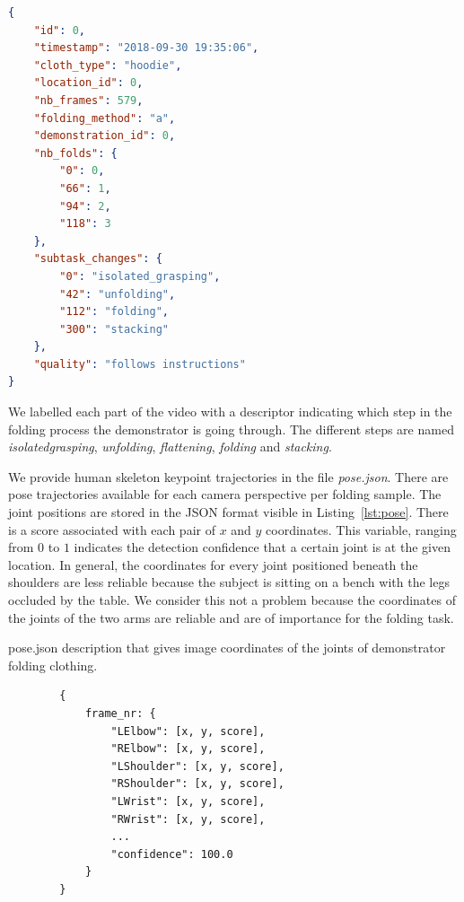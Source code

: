 \documentclass[\home/main.tex]{subfiles}
\begin{document}
\begin{lstlisting}[language=json, caption=annotations.json description, label={lst:annotations}, float,floatplacement=H, captionpos=b]
{
    "id": 0,
    "timestamp": "2018-09-30 19:35:06",
    "cloth_type": "hoodie",
    "location_id": 0,
    "nb_frames": 579,
    "folding_method": "a",
    "demonstration_id": 0,
    "nb_folds": {
        "0": 0,
        "66": 1,
        "94": 2,
        "118": 3
    },
    "subtask_changes": {
        "0": "isolated_grasping",
        "42": "unfolding",
        "112": "folding",
        "300": "stacking"
    },
    "quality": "follows instructions"
}
\end{lstlisting}

We labelled each part of the video with a descriptor indicating which step in the folding process the demonstrator is going through. The different steps are named \textit{isolated\textunderscore grasping}, \textit{unfolding}, \textit{flattening}, \textit{folding} and \textit{stacking}. 

We provide human skeleton keypoint trajectories in the file \textit{pose.json}. There are pose trajectories available for each camera perspective per folding sample. The joint positions are stored in the JSON format visible in Listing~\ref{lst:pose}. There is a score associated with each pair of $x$ and $y$ coordinates. This variable, ranging from $0$ to $1$ indicates the detection confidence that a certain joint is at the given location. In general, the coordinates for every joint positioned beneath the shoulders are less reliable because the subject is sitting on a bench with the legs occluded by the table. We consider this not a problem because the coordinates of the joints of the two arms are reliable and are of importance for the folding task. 



\begin{listing}[htb]
    \caption{pose.json description that gives image coordinates of the joints of demonstrator folding clothing.}
    \label{lst:pose}
    \begin{verbatim}
        {
            frame_nr: {
                "LElbow": [x, y, score],
                "RElbow": [x, y, score],
                "LShoulder": [x, y, score],
                "RShoulder": [x, y, score],
                "LWrist": [x, y, score],
                "RWrist": [x, y, score],
                ... 
                "confidence": 100.0
            }
        }
    \end{verbatim}
\end{listing}
\end{document}
